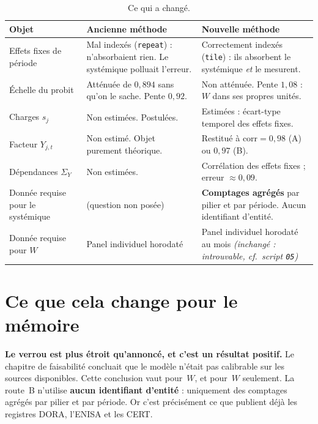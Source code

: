 \documentclass[11pt,a4paper]{article}
\newcommand{\Y}{Y}
\begin{document}
\begin{table}[h]
\centering
\small
\caption{Ce qui a changé.}
\begin{tabularx}{\textwidth}{>{\raggedright\arraybackslash}p{3.5cm} >{\raggedright\arraybackslash}X >{\raggedright\arraybackslash}X}
\toprule
\textbf{Objet} & \textbf{Ancienne méthode} & \textbf{Nouvelle méthode} \\
\midrule
Effets fixes de période
  & Mal indexés (\texttt{repeat}) : n'absorbaient rien. Le systémique polluait l'erreur.
  & Correctement indexés (\texttt{tile}) : ils absorbent le systémique \emph{et} le mesurent. \\
\addlinespace
Échelle du probit
  & Atténuée de $0{,}894$ sans qu'on le sache. Pente $0{,}92$.
  & Non atténuée. Pente $1{,}08$ : $W$ dans ses propres unités. \\
\addlinespace
Charges $s_j$
  & Non estimées. Postulées.
  & Estimées : écart-type temporel des effets fixes. \\
\addlinespace
Facteur $\Y_{j,t}$
  & Non estimé. Objet purement théorique.
  & Restitué à $\mathrm{corr} = 0{,}98$ (A) ou $0{,}97$ (B). \\
\addlinespace
Dépendances $\Sigma_Y$
  & Non estimées.
  & Corrélation des effets fixes ; erreur $\approx 0{,}09$. \\
\addlinespace
Donnée requise pour le systémique
  & (question non posée)
  & \textbf{Comptages agrégés} par pilier et par période. Aucun identifiant d'entité. \\
\addlinespace
Donnée requise pour $W$
  & Panel individuel horodaté
  & Panel individuel horodaté au mois \emph{(inchangé : introuvable, cf.~script \texttt{05})} \\
\bottomrule
\end{tabularx}
\end{table}

\section{Ce que cela change pour le mémoire}

\begin{cle}
\textbf{Le verrou est plus étroit qu'annoncé, et c'est un résultat positif.} Le chapitre de
faisabilité concluait que le modèle n'était pas calibrable sur les sources disponibles. Cette
conclusion vaut pour~$W$, et pour~$W$ seulement. La route~B n'utilise \textbf{aucun
identifiant d'entité} : uniquement des comptages agrégés par pilier et par période. Or c'est
précisément ce que publient déjà les registres DORA, l'ENISA et les CERT.
\end{cle}
\end{document}
